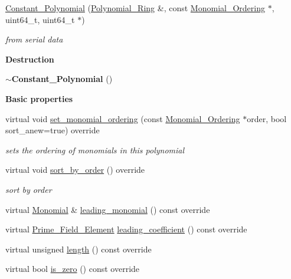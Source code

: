 \begin{Indent}
\begin{DoxyCompactItemize}
\mbox{\label{group__polygroup_a9fd6527f6fe525668cc53e0d2aa384ca}} 
\hyperlink{group__polygroup_a9fd6527f6fe525668cc53e0d2aa384ca}{Constant\+\_\+\+Polynomial} (\hyperlink{group__polygroup_class_polynomial___ring}{Polynomial\+\_\+\+Ring} \&, const \hyperlink{group__orderinggroup_class_monomial___ordering}{Monomial\+\_\+\+Ordering} $\ast$, uint64\+\_\+t, uint64\+\_\+t $\ast$)
\begin{DoxyCompactList}\small\item\em from serial data \end{DoxyCompactList}\end{DoxyCompactItemize}
\end{Indent}
\begin{Indent}\textbf{ Destruction}\par
\begin{DoxyCompactItemize}
\item 
\mbox{\label{group__polygroup_aa535c175852c76c71e0ef556d8e25579}} 
{\bfseries $\sim$\+Constant\+\_\+\+Polynomial} ()
\end{DoxyCompactItemize}
\end{Indent}
\begin{Indent}\textbf{ Basic properties}\par
\begin{DoxyCompactItemize}
\item 
virtual void \hyperlink{group__polygroup_a539835f92490fbbb5ba3b37e4f80ef49}{set\+\_\+monomial\+\_\+ordering} (const \hyperlink{group__orderinggroup_class_monomial___ordering}{Monomial\+\_\+\+Ordering} $\ast$order, bool sort\+\_\+anew=true) override
\begin{DoxyCompactList}\small\item\em sets the ordering of monomials in this polynomial \end{DoxyCompactList}\item 
virtual void \hyperlink{group__polygroup_a808018b52eca472a7a1b2995e403f35a}{sort\+\_\+by\+\_\+order} () override
\begin{DoxyCompactList}\small\item\em sort by order \end{DoxyCompactList}\item 
virtual \hyperlink{group__polygroup_class_monomial}{Monomial} \& \hyperlink{group__polygroup_a08a102d5d0f33bc9cc604316e6256788}{leading\+\_\+monomial} () const override
\item 
virtual \hyperlink{group___fields_group_class_prime___field___element}{Prime\+\_\+\+Field\+\_\+\+Element} \hyperlink{group__polygroup_ab1451de8d6d9f9b0c7df2aef7b32625d}{leading\+\_\+coefficient} () const override
\item 
virtual unsigned \hyperlink{group__polygroup_a9a6bcfaf1f4d6260b39f6abfb2b646ea}{length} () const override
\item 
virtual bool \hyperlink{group__polygroup_a14a9a2dbab454f5b20441a51a6000888}{is\+\_\+zero} () const override
\end{DoxyCompactItemize}
\end{Indent}
